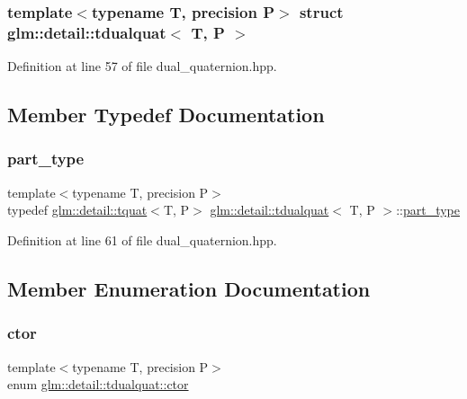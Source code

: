 \subsubsection*{template$<$typename T, precision P$>$\newline
struct glm\+::detail\+::tdualquat$<$ T, P $>$}



Definition at line 57 of file dual\+\_\+quaternion.\+hpp.



\subsection{Member Typedef Documentation}
\mbox{\label{structglm_1_1detail_1_1tdualquat_a811e451c41fec5277ac7c99381152df4}} 
\subsubsection{\texorpdfstring{part\+\_\+type}{part\_type}}
{\footnotesize\ttfamily template$<$typename T, precision P$>$ \\
typedef \hyperlink{structglm_1_1detail_1_1tquat}{glm\+::detail\+::tquat}$<$T, P$>$ \hyperlink{structglm_1_1detail_1_1tdualquat}{glm\+::detail\+::tdualquat}$<$ T, P $>$\+::\hyperlink{structglm_1_1detail_1_1tdualquat_a811e451c41fec5277ac7c99381152df4}{part\+\_\+type}}



Definition at line 61 of file dual\+\_\+quaternion.\+hpp.



\subsection{Member Enumeration Documentation}
\mbox{\label{structglm_1_1detail_1_1tdualquat_ace336aab392c50d450452edacc3d7f41}} 
\subsubsection{\texorpdfstring{ctor}{ctor}}
{\footnotesize\ttfamily template$<$typename T, precision P$>$ \\
enum \hyperlink{structglm_1_1detail_1_1tdualquat_ace336aab392c50d450452edacc3d7f41}{glm\+::detail\+::tdualquat\+::ctor}}

